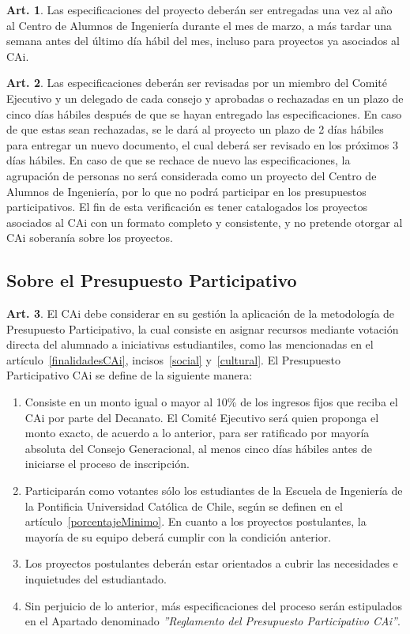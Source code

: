 \documentclass[letterpaper,11pt]{article}
\theoremstyle{definition}%
\newtheorem{art}{Art.} %
\begin{document}
\begin{art}
	Las especificaciones del proyecto deberán ser entregadas una vez al año al Centro de Alumnos de Ingeniería durante el mes de marzo, a más tardar una semana antes del último día hábil del mes, incluso para proyectos ya asociados al CAi.
\end{art}

\begin{art}
	Las especificaciones deberán ser revisadas por un miembro del Comité Ejecutivo y un delegado de cada consejo y aprobadas o rechazadas en un plazo de cinco días hábiles después de que se hayan entregado las especificaciones. En caso de que estas sean rechazadas, se le dará al proyecto un plazo de 2 días hábiles para entregar un nuevo documento, el cual deberá ser revisado en los próximos 3 días hábiles. En caso de que se rechace de nuevo las especificaciones, la agrupación de personas no será considerada como un proyecto del Centro de Alumnos de Ingeniería, por lo que no podrá participar en los presupuestos participativos. El fin de esta verificación es tener catalogados los proyectos asociados al CAi con un formato completo y consistente, y no pretende otorgar al CAi soberanía sobre los proyectos.
\end{art}


\subsection*{Sobre el Presupuesto Participativo}

\begin{art}\label{definicionPParticipativo1}
	El CAi debe considerar en su gestión la aplicación de la metodología de Presupuesto Participativo, la cual consiste en asignar recursos mediante votación directa del alumnado a iniciativas estudiantiles, como las mencionadas en el artículo~\ref{finalidadesCAi}, incisos~\ref{social} y~\ref{cultural}. El Presupuesto Participativo CAi se define de la siguiente manera:
	\begin{enumerate}
		\item Consiste en un monto igual o mayor al 10\% de los ingresos fijos que reciba el CAi por parte del Decanato. El Comité Ejecutivo será quien proponga el monto exacto, de acuerdo a lo anterior, para ser ratificado por mayoría absoluta del Consejo Generacional, al menos cinco días hábiles antes de iniciarse el proceso de inscripción.
		\item Participarán como votantes sólo los estudiantes de la Escuela de Ingeniería de la Pontificia Universidad Católica de Chile, según se definen en el artículo~\ref{porcentajeMinimo}. En cuanto a los proyectos postulantes, la mayoría de su equipo deberá cumplir con la condición anterior.
		\item Los proyectos postulantes deberán estar orientados a cubrir las necesidades e inquietudes del estudiantado.
		\item Sin perjuicio de lo anterior, más especificaciones del proceso serán estipulados en el Apartado denominado \textit{''Reglamento del Presupuesto Participativo CAi''}.
	\end{enumerate}
\end{art}
\end{document}
